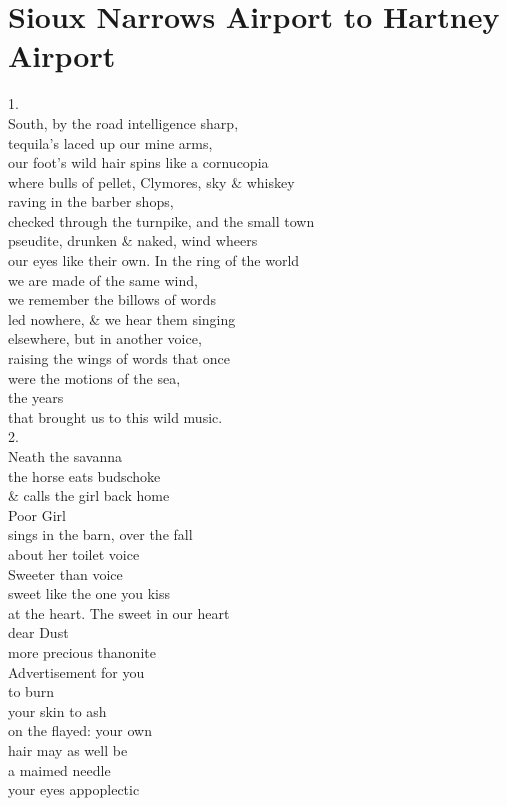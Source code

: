 \documentclass[smalldemyvopaper,11pt,twoside,onecolumn,openright,extrafontsizes]{memoir}
\begin{document}
\chapter{Sioux Narrows Airport to Hartney Airport}
1.
\\South, by the road intelligence sharp,
\\tequila's laced up our mine arms,
\\our foot's wild hair spins like a cornucopia
\\where bulls of pellet, Clymores, sky \& whiskey
\\raving in the barber shops,
\\checked through the turnpike, and the small town
\\pseudite, drunken \& naked, wind wheers
\\our eyes like their own. In the ring of the world
\\we are made of the same wind,
\\we remember the billows of words
\\led nowhere, \& we hear them singing
\\elsewhere, but in another voice,
\\raising the wings of words that once
\\were the motions of the sea,
\\the years
\\that brought us to this wild music.
\\2.
\\Neath the savanna
\\the horse eats budschoke
\\\& calls the girl back home
\\Poor Girl
\\sings in the barn, over the fall
\\about her toilet voice
\\Sweeter than voice
\\sweet like the one you kiss
\\at the heart. The sweet in our heart
\\dear Dust
\\more precious thanonite
\\Advertisement for you
\\to burn
\\your skin to ash
\\on the flayed: your own
\\hair may as well be
\\a maimed needle
\\your eyes appoplectic
\end{document}
